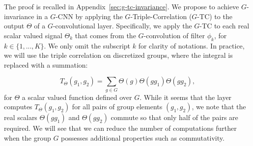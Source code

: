 The proof is recalled in Appendix~\ref{sec:g-tc-invariance}. We propose to achieve $G$-invariance in a $G$-CNN by applying the $G$-Triple-Correlation ($G$-TC) to the output $\Theta$ of a $G$-convolutional layer. Specifically, we apply the $G$-TC to each real scalar valued signal $\Theta_k$ that comes from the $G$-convolution of filter $\phi_k$, for $k \in \{1, ..., K\}$. We only omit the subscript $k$ for clarity of notations. In practice, we will use the triple correlation on discretized groups, where the integral is replaced with a summation:







\begin{equation}
    T_\Theta(g_1, g_2)= \sum_{g \in G} \Theta(g) \Theta(gg_1) \Theta(gg_2),
    \end{equation}
for $\Theta$ a scalar valued function defined over $G$.
While it seems that the layer computes $T_\Theta(g_1, g_2)$ for all pairs of group elements $(g_1, g_2)$, we note that the real scalars $\Theta(gg_1)$ and $\Theta(gg_2)$ commute so that only half of the pairs are required. We will see that we can reduce the number of computations further when the group $G$ possesses additional properties such as commutativity.

